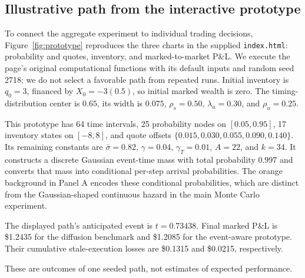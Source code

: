 \clearpage
\subsection{Illustrative path from the interactive prototype}
\label{sec:prototype}
To connect the aggregate experiment to individual trading decisions,
Figure~\ref{fig:prototype} reproduces the three charts in the supplied
\texttt{index.html}: probability and quotes, inventory, and marked-to-market
P\&L. We execute the page's original computational functions with its default
inputs and random seed 2718; we do not select a favorable path from repeated
runs. Initial inventory is $q_0=3$, financed by $X_0=-3(0.5)$, so initial marked
wealth is zero. The timing-distribution center is $0.65$, its width is $0.075$,
$\rho_s=0.50$, $\lambda_u=0.30$, and $\rho_u=0.25$.

This prototype has 64 time intervals, 25 probability nodes on $[0.05,0.95]$,
17 inventory states on $[-8,8]$, and quote offsets
$\{0.015,0.030,0.055,0.090,0.140\}$. Its remaining constants are
$\bar\sigma=0.82$, $\gamma=0.04$, $\gamma_T=0.01$, $A=22$, and $k=34$.
It constructs a discrete Gaussian event-time mass with total probability
$0.997$ and converts that mass into conditional per-step arrival probabilities.
The orange background in Panel A encodes these conditional probabilities,
which are distinct from the Gaussian-shaped continuous hazard in the main
Monte Carlo experiment.

The displayed path's anticipated event is $t=0.73438$. Final marked
P\&L is \$1.2435 for the diffusion benchmark and
\$1.2085 for the event-aware prototype. Their cumulative
stale-execution losses are \$0.1315 and
\$0.0215, respectively.

These are outcomes of one seeded path, not estimates of expected performance.

